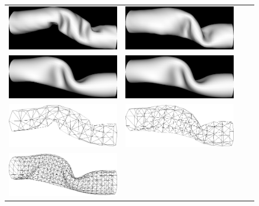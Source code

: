 \begin{figure}[tbh]
  \centering
  \begin{tabular}{cccc}
    \includegraphics[width=0.48\columnwidth]{img/twist-06-cg.png}
    &
    \includegraphics[width=0.48\columnwidth]{img/twist-08-cg.png} 
    \\
    \includegraphics[width=0.48\columnwidth]{img/twist-16-cg.png}
    &
    \includegraphics[width=0.48\columnwidth]{img/twist-31-cg.png}
    \\
    \includegraphics[width=0.48\columnwidth]{img/twist-06w-cg.png}
    &
    \includegraphics[width=0.48\columnwidth]{img/twist-08w-cg.png}
    \\
    \includegraphics[width=0.48\columnwidth]{img/twist-16w-cg.png}

\end{tabular}
\end{figure}
